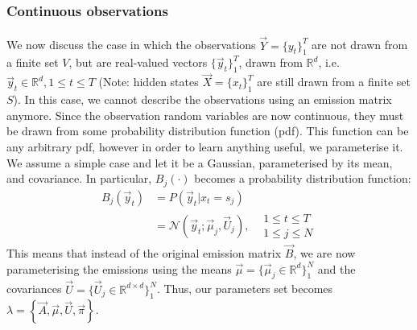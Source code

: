 \subsubsection{Continuous observations}

\paragraph{}
	We now discuss the case in which the observations $\vec Y = \{y_t\}_1^T$ are not drawn from a finite set $V$, but are real-valued vectors $\{\vec y_t\}_1^T$, drawn from $\mathbb{R}^d$, i.e. $\vec y_t \in \mathbb{R}^d, 1 \leq t \leq T$ (Note: hidden states $\vec X = \{x_t\}_1^T$ are still drawn from a finite set $S$). In this case, we cannot describe the observations using an emission matrix anymore. Since the observation random variables are now continuous, they must be drawn from some probability distribution function (pdf). This function can be any arbitrary pdf, however in order to learn anything useful, we parameterise it. We assume a simple case and let it be a Gaussian, parameterised by its mean, and covariance. In particular, $B_j(\cdot)$ becomes a probability distribution function:
	\begin{align}
		B_j(\vec y_t) 	& = P\left( \vec y_t | x_t = s_j\right) \nonumber\\
					& = \mathcal{N}(\vec y_t; \vec\mu_j, \vec U_j), \label{eqn:gaussian}&
		\begin{array}{lr}
			1 \leq t \leq T\\
			1 \leq j \leq N
		\end{array}
	\end{align}
This means that instead of the original emission matrix $\vec B$, we are now parameterising the emissions using the means $\vec\mu = \{\vec\mu_j \in \mathbb{R}^d\}_1^N$ and the covariances $\vec U = \{\vec U_j \in \mathbb{R}^{d\times d}\}_1^N$. Thus, our parameters set becomes $\lambda = \left\{ \vec A, \vec \mu, \vec U, \vec \pi\right\}$.

